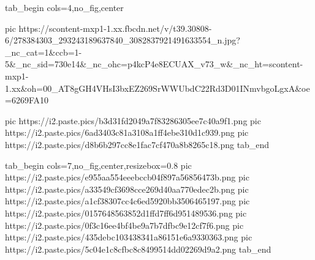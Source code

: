  
 
 
 
 


\ifcmt
  tab_begin cols=4,no_fig,center

     pic https://scontent-mxp1-1.xx.fbcdn.net/v/t39.30808-6/278384303_293243189637840_3082837921491633554_n.jpg?_nc_cat=1&ccb=1-5&_nc_sid=730e14&_nc_ohc=p4kcP4e8ECUAX_v73_w&_nc_ht=scontent-mxp1-1.xx&oh=00_AT8gGH4VHsI3bxEZ269SrWWUbdC22Rd3D01INmvbgoLgxA&oe=6269FA10

		 pic https://i2.paste.pics/b3d31fd2049a7f83286305ee7c40a9f1.png
		 pic https://i2.paste.pics/6ad3403c81a3108a1ff4ebe310d1c939.png
		 pic https://i2.paste.pics/d8b6b297cc8e1fac7cf470a8b8265c18.png
  tab_end
\fi

\ifcmt
  tab_begin cols=7,no_fig,center,resizebox=0.8
     pic https://i2.paste.pics/e955aa554eeebccb04f897a56856473b.png
		 pic https://i2.paste.pics/a33549cf3698cce269d40aa770edec2b.png
		 pic https://i2.paste.pics/a1cf38307cc4c6ed5920bb3506465197.png
		 pic https://i2.paste.pics/0157648563852d1ffd7ff6d951489536.png
		 pic https://i2.paste.pics/0f3c16ee4bf4be9a7b7dfbc9e12cf7f6.png
		 pic https://i2.paste.pics/435debc103438341a86151e6a9330363.png
		 pic https://i2.paste.pics/5c04e1c8cfbc8c8499514dd02269d9a2.png
  tab_end
\fi
